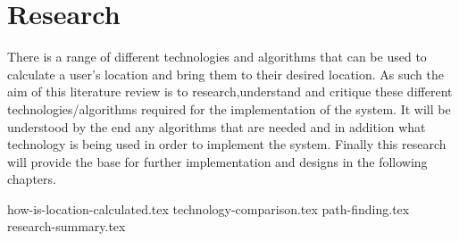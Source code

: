 \section{Research}
There is a range of different technologies and algorithms that can be used to calculate a user’s location and bring them to their desired location. As such the aim of this literature review is to research,understand and critique these different technologies/algorithms required for the implementation of the system. It will be understood by the end any algorithms that are needed and in addition what technology is being used in order to implement the system. Finally this research will provide the base for further implementation and designs in the following chapters.
		
{how-is-location-calculated.tex}
{technology-comparison.tex}
{path-finding.tex}
{research-summary.tex}
